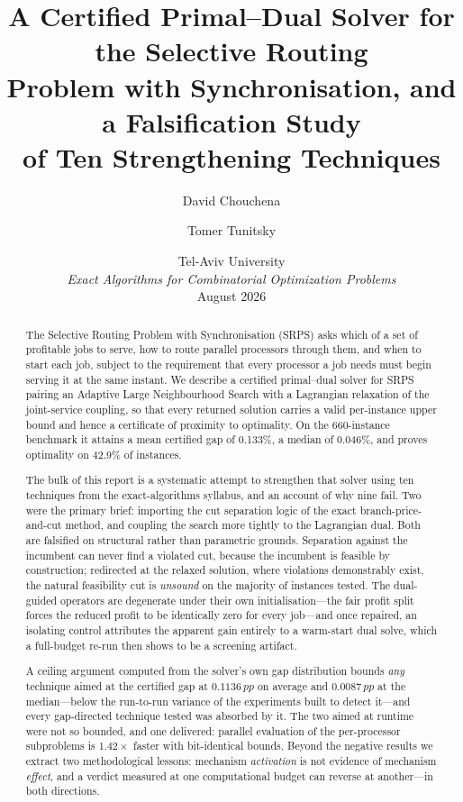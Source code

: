 \documentclass[11pt,a4paper]{article}
\title{A Certified Primal--Dual Solver for the Selective Routing\\
Problem with Synchronisation, and a Falsification Study\\
of Ten Strengthening Techniques}
\author{David Chouchena \and Tomer Tunitsky}
\date{%
  Tel-Aviv University\\[2pt]
  \emph{Exact Algorithms for Combinatorial Optimization Problems}\\[8pt]
  August 2026
}
\newcommand{\pp}{\,pp}
\begin{document}
\maketitle

\begin{abstract}
The Selective Routing Problem with Synchronisation (SRPS) asks which of a set of
profitable jobs to serve, how to route parallel processors through them, and when
to start each job, subject to the requirement that every processor a job needs
must begin serving it at the same instant. We describe a certified primal--dual
solver for SRPS pairing an Adaptive Large Neighbourhood Search with a Lagrangian
relaxation of the joint-service coupling, so that every returned solution carries
a valid per-instance upper bound and hence a certificate of proximity to
optimality. On the 660-instance benchmark it attains a mean certified gap of
0.133\%, a median of 0.046\%, and proves optimality on 42.9\% of instances.

The bulk of this report is a systematic attempt to strengthen that solver using
ten techniques from the exact-algorithms syllabus, and an account of why nine
fail. Two were the primary brief: importing the cut separation logic of the exact
branch-price-and-cut method, and coupling the search more tightly to the
Lagrangian dual. Both are falsified on structural rather than parametric grounds.
Separation against the incumbent can never find a violated cut, because the
incumbent is feasible by construction; redirected at the relaxed solution, where
violations demonstrably exist, the natural feasibility cut is \emph{unsound} on
the majority of instances tested. The dual-guided operators are degenerate under
their own initialisation---the fair profit split forces the reduced profit to be
identically zero for every job---and once repaired, an isolating control
attributes the apparent gain entirely to a warm-start dual solve, which a
full-budget re-run then shows to be a screening artifact.

A ceiling argument computed from the solver's own gap distribution bounds
\emph{any} technique aimed at the certified gap at $0.1136\pp$ on average and
$0.0087\pp$ at the median---below the run-to-run variance of the experiments built
to detect it---and every gap-directed technique tested was absorbed by it. The two
aimed at runtime were not so bounded, and one delivered: parallel evaluation of
the per-processor subproblems is $1.42\times$ faster with bit-identical bounds.
Beyond the negative results we extract two methodological lessons: mechanism
\emph{activation} is not evidence of mechanism \emph{effect}, and a verdict
measured at one computational budget can reverse at another---in both directions.
\end{abstract}
\end{document}
